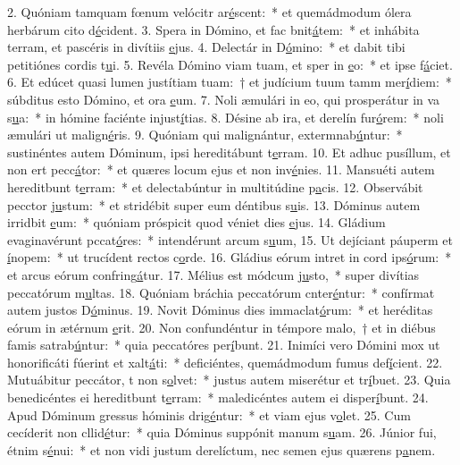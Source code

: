 2. Quóniam tamquam fœnum velócitr ar\uline{é}scent:~* et quemádmodum ólera herbárum cito d\uline{é}cident.
3. Spera in Dómino, et fac bnit\uline{á}tem:~* et inhábita terram, et pascéris in divítiis \uline{e}jus.
4. Delectár in D\uline{ó}mino:~* et dabit tibi petitiónes cordis t\uline{u}i.
5. Revéla Dómino viam tuam, et sper in \uline{e}o:~* et ipse f\uline{á}ciet.
6. Et edúcet quasi lumen justítiam tuam:~† et judícium tuum tamm mer\uline{í}diem:~* súbditus esto Dómino, et ora \uline{e}um.
7. Noli æmulári in eo, qui prosperátur in va s\uline{u}a:~* in hómine faciénte injust\uline{í}tias.
8. Désine ab ira, et derelín fur\uline{ó}rem:~* noli æmulári ut malign\uline{é}ris.
9. Quóniam qui malignántur, extermnab\uline{ú}ntur:~* sustinéntes autem Dóminum, ipsi hereditábunt t\uline{e}rram.
10. Et adhuc pusíllum, et non ert pecc\uline{á}tor:~* et quæres locum ejus et non inv\uline{é}nies.
11. Mansuéti autem hereditbunt t\uline{e}rram:~* et delectabúntur in multitúdine p\uline{a}cis.
12. Observábit pecctor j\uline{u}stum:~* et stridébit super eum déntibus s\uline{u}is.
13. Dóminus autem irridbit \uline{e}um:~* quóniam próspicit quod véniet dies \uline{e}jus.
14. Gládium evaginavérunt pccat\uline{ó}res:~* intendérunt arcum s\uline{u}um,
15. Ut dejíciant páuperm et \uline{í}nopem:~* ut trucídent rectos c\uline{o}rde.
16. Gládius eórum intret in cord ips\uline{ó}rum:~* et arcus eórum confring\uline{á}tur.
17. Mélius est módcum j\uline{u}sto,~* super divítias peccatórum m\uline{u}ltas.
18. Quóniam bráchia peccatórum cnter\uline{é}ntur:~* confírmat autem justos D\uline{ó}minus.
19. Novit Dóminus dies immaclat\uline{ó}rum:~* et heréditas eórum in ætérnum \uline{e}rit.
20. Non confundéntur in témpore malo,~† et in diébus famis satrab\uline{ú}ntur:~* quia peccatóres per\uline{í}bunt.
21. Inimíci vero Dómini mox ut honorificáti fúerint et xalt\uline{á}ti:~* deficiéntes, quemádmodum fumus def\uline{í}cient.
22. Mutuábitur peccátor, t non s\uline{o}lvet:~* justus autem miserétur et tr\uline{í}buet.
23. Quia benedicéntes ei hereditbunt t\uline{e}rram:~* maledicéntes autem ei disper\uline{í}bunt.
24. Apud Dóminum gressus hóminis drig\uline{é}ntur:~* et viam ejus v\uline{o}let.
25. Cum cecíderit non cllid\uline{é}tur:~* quia Dóminus suppónit manum s\uline{u}am.
26. Júnior fui, étnim s\uline{é}nui:~* et non vidi justum derelíctum, nec semen ejus quærens p\uline{a}nem.

